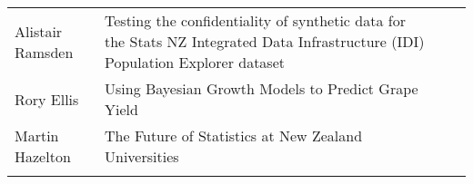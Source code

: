 \documentclass[
]{book}
\begin{document}
\begin{longtable}[]{@{}llll@{}}
\begin{minipage}[t]{0.22\columnwidth}\raggedright
Alistair Ramsden\strut
\end{minipage} & \begin{minipage}[t]{0.22\columnwidth}\raggedright
Testing the confidentiality of synthetic data for the Stats NZ Integrated Data Infrastructure (IDI) Population Explorer dataset\strut
\end{minipage} & \begin{minipage}[t]{0.22\columnwidth}\raggedright
\strut
\end{minipage} & \begin{minipage}[t]{0.22\columnwidth}\raggedright
\strut
\end{minipage}\tabularnewline
\begin{minipage}[t]{0.22\columnwidth}\raggedright
Rory Ellis\strut
\end{minipage} & \begin{minipage}[t]{0.22\columnwidth}\raggedright
Using Bayesian Growth Models to Predict Grape Yield\strut
\end{minipage} & \begin{minipage}[t]{0.22\columnwidth}\raggedright
\strut
\end{minipage} & \begin{minipage}[t]{0.22\columnwidth}\raggedright
\strut
\end{minipage}\tabularnewline
\begin{minipage}[t]{0.22\columnwidth}\raggedright
Martin Hazelton\strut
\end{minipage} & \begin{minipage}[t]{0.22\columnwidth}\raggedright
The Future of Statistics at New Zealand Universities\strut
\end{minipage} & \begin{minipage}[t]{0.22\columnwidth}\raggedright
\strut
\end{minipage} & \begin{minipage}[t]{0.22\columnwidth}\raggedright
\strut
\end{minipage}\tabularnewline
\begin{minipage}[t]{0.22\columnwidth}\raggedright
\strut
\end{minipage} & \begin{minipage}[t]{0.22\columnwidth}\raggedright
\strut
\end{minipage} & \begin{minipage}[t]{0.22\columnwidth}\raggedright
\strut
\end{minipage} & \begin{minipage}[t]{0.22\columnwidth}\raggedright

\end{minipage}
\end{longtable}
\end{document}
